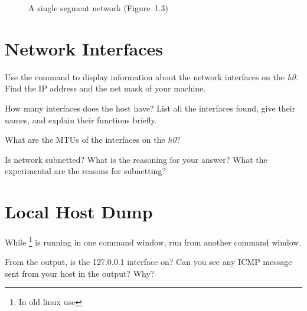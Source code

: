 \documentclass{../UTNetLab}
\begin{document}
\begin{center}
\begin{minipage}{0.48\textwidth}
\begin{flushright}
\begin{figure}[H]
                \caption{A single segment network (Figure~1.3)}\label{fig:1.3}
            \end{figure}
        \end{flushright}
    \end{minipage}
\end{center}

\section{Network Interfaces}
Use the  command to display information about the network interfaces on the \textit{h0}.
Find the IP address and the net mask of your machine.

\begin{report}
    \item How many interfaces does the host have?
    List all the interfaces found, give their names, and explain their functions briefly.

    \item What are the MTUs of the interfaces on the \textit{h0}?

    \item Is network subnetted?
    What is the reasoning for your answer? What the experimental are the reasons for subnetting?
\end{report}


\section{Local Host Dump}
While \footnote{In old linux use } is running in one command window, run  from another command window.

\begin{report}
    \item From the  output, is the 127.0.0.1 interface on?
    Can you see any ICMP message sent from your host in the  output?
    Why?
\end{report}
\end{document}

